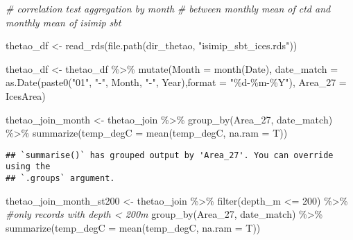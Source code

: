 \documentclass[
]{article}
\newenvironment{Shaded}{\begin{snugshade}}{\end{snugshade}}
\newcommand{\AttributeTok}[1]{\textcolor[rgb]{0.77,0.63,0.00}{#1}}
\newcommand{\CommentTok}[1]{\textcolor[rgb]{0.56,0.35,0.01}{\textit{#1}}}
\newcommand{\DecValTok}[1]{\textcolor[rgb]{0.00,0.00,0.81}{#1}}
\newcommand{\FunctionTok}[1]{\textcolor[rgb]{0.00,0.00,0.00}{#1}}
\newcommand{\NormalTok}[1]{#1}
\newcommand{\OtherTok}[1]{\textcolor[rgb]{0.56,0.35,0.01}{#1}}
\newcommand{\SpecialCharTok}[1]{\textcolor[rgb]{0.00,0.00,0.00}{#1}}
\newcommand{\StringTok}[1]{\textcolor[rgb]{0.31,0.60,0.02}{#1}}
\begin{document}
\begin{Shaded}
\begin{Highlighting}[]
\CommentTok{\# correlation test aggregation by month}
\CommentTok{\# between monthly mean of ctd and monthly mean of isimip sbt}

\NormalTok{thetao\_df }\OtherTok{\textless{}{-}} \FunctionTok{read\_rds}\NormalTok{(}\FunctionTok{file.path}\NormalTok{(dir\_thetao, }\StringTok{"isimip\_sbt\_ices.rds"}\NormalTok{))}

\NormalTok{thetao\_df }\OtherTok{\textless{}{-}}\NormalTok{ thetao\_df }\SpecialCharTok{\%\textgreater{}\%} 
  \FunctionTok{mutate}\NormalTok{(}\AttributeTok{Month =} \FunctionTok{month}\NormalTok{(Date),}
         \AttributeTok{date\_match =} \FunctionTok{as.Date}\NormalTok{(}\FunctionTok{paste0}\NormalTok{(}\StringTok{"01"}\NormalTok{, }\StringTok{"{-}"}\NormalTok{, Month, }\StringTok{"{-}"}\NormalTok{, Year),}\AttributeTok{format =} \StringTok{"\%d{-}\%m{-}\%Y"}\NormalTok{), }
         \AttributeTok{Area\_27 =}\NormalTok{ IcesArea) }

\NormalTok{thetao\_join\_month }\OtherTok{\textless{}{-}}\NormalTok{ thetao\_join }\SpecialCharTok{\%\textgreater{}\%} 
  \FunctionTok{group\_by}\NormalTok{(Area\_27, date\_match) }\SpecialCharTok{\%\textgreater{}\%} 
  \FunctionTok{summarize}\NormalTok{(}\AttributeTok{temp\_degC =} \FunctionTok{mean}\NormalTok{(temp\_degC, }\AttributeTok{na.ram =}\NormalTok{ T))}
\end{Highlighting}
\end{Shaded}

\begin{verbatim}
## `summarise()` has grouped output by 'Area_27'. You can override using the
## `.groups` argument.
\end{verbatim}

\begin{Shaded}
\begin{Highlighting}[]
\NormalTok{thetao\_join\_month\_st200 }\OtherTok{\textless{}{-}}\NormalTok{ thetao\_join }\SpecialCharTok{\%\textgreater{}\%} 
  \FunctionTok{filter}\NormalTok{(depth\_m }\SpecialCharTok{\textless{}=} \DecValTok{200}\NormalTok{) }\SpecialCharTok{\%\textgreater{}\%} \CommentTok{\#only records with depth \textless{} 200m}
  \FunctionTok{group\_by}\NormalTok{(Area\_27, date\_match) }\SpecialCharTok{\%\textgreater{}\%} 
  \FunctionTok{summarize}\NormalTok{(}\AttributeTok{temp\_degC =} \FunctionTok{mean}\NormalTok{(temp\_degC, }\AttributeTok{na.ram =}\NormalTok{ T))}
\end{Highlighting}
\end{Shaded}
\end{document}
